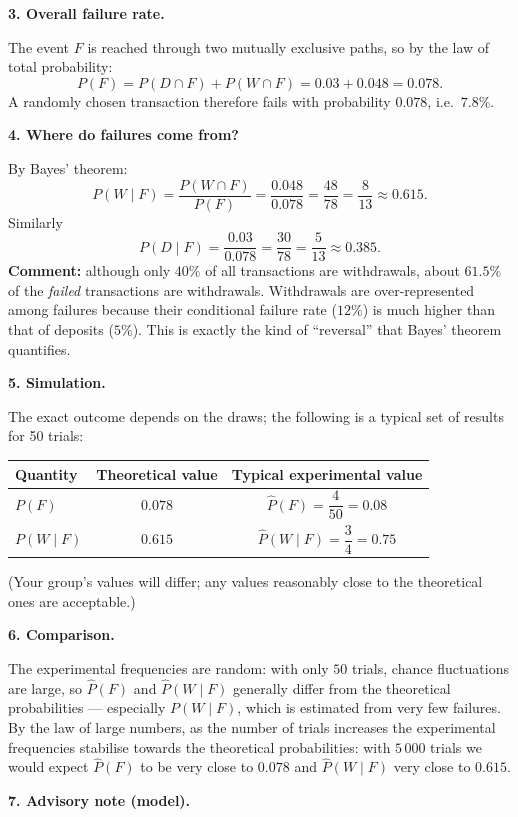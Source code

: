 \documentclass[11pt]{article}
\newcommand{\cle}[1]{{\popxbold\color{popdark}#1}}
\begin{document}
\textbf{3. Overall failure rate.}\par
The event $F$ is reached through two mutually exclusive paths, so by the law of total probability:
\[
P(F)=P(D\cap F)+P(W\cap F)=0.03+0.048=0.078.
\]
A randomly chosen transaction therefore fails with probability $0.078$, i.e.\ $7.8\%$.

\textbf{4. Where do failures come from?}\par
By Bayes' theorem:
\[
P(W\mid F)=\frac{P(W\cap F)}{P(F)}=\frac{0.048}{0.078}=\frac{48}{78}=\frac{8}{13}\approx 0.615.
\]
Similarly
\[
P(D\mid F)=\frac{0.03}{0.078}=\frac{30}{78}=\frac{5}{13}\approx 0.385.
\]
\textbf{Comment:} although only $40\%$ of all transactions are withdrawals, about $61.5\%$ of the \emph{failed} transactions are withdrawals. Withdrawals are over-represented among failures because their conditional failure rate ($12\%$) is much higher than that of deposits ($5\%$). This is exactly the kind of ``reversal'' that Bayes' theorem quantifies.

\textbf{5. Simulation.}\par
The exact outcome depends on the draws; the following is a typical set of results for 50 trials:
\begin{center}
\begin{tabular}{|l|c|c|}
\hline
\rowcolor{popblueL} Quantity & Theoretical value & Typical experimental value \\
\hline
$P(F)$ & $0.078$ & $\widehat{P}(F)=\dfrac{4}{50}=0.08$ \\
\hline
$P(W\mid F)$ & $0.615$ & $\widehat{P}(W\mid F)=\dfrac{3}{4}=0.75$ \\
\hline
\end{tabular}
\end{center}
(Your group's values will differ; any values reasonably close to the theoretical ones are acceptable.)

\textbf{6. Comparison.}\par
The experimental frequencies are random: with only $50$ trials, chance fluctuations are large, so $\widehat{P}(F)$ and $\widehat{P}(W\mid F)$ generally differ from the theoretical probabilities — especially $P(W\mid F)$, which is estimated from very few failures. By the \cle{law of large numbers}, as the number of trials increases the experimental frequencies stabilise towards the theoretical probabilities: with $5\,000$ trials we would expect $\widehat{P}(F)$ to be very close to $0.078$ and $\widehat{P}(W\mid F)$ very close to $0.615$.

\textbf{7. Advisory note (model).}\par
\end{document}

